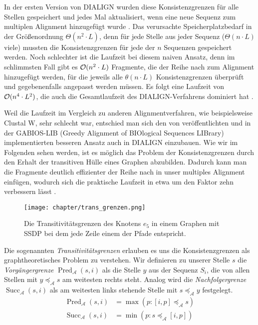 In der ersten Version von DIALIGN wurden diese Konsistenzgrenzen für alle Stellen gespeichert und jedes Mal aktualisiert, wenn eine neue Sequenz zum multiplen Alignment hinzugefügt wurde \cite{mdw96}. Das verursachte Speicherplatzbedarf in der Größenordnung $\Theta(n^2\cdot L)$, denn für jede Stelle aus jeder Sequenz ($\Theta(n\cdot L)$ viele) mussten die Konsistenzgrenzen für jede der $n$ Sequenzen gespeichert werden. Noch schlechter ist die Laufzeit bei diesem naiven Ansatz, denn im schlimmsten Fall gibt es $\mathcal{O}(n^2\cdot L)$ Fragmente, die der Reihe nach zum Alignment hinzugefügt werden, für die jeweils alle $\theta(n\cdot L)$ Konsistenzgrenzen überprüft und gegebenenfalls angepasst werden müssen. Es folgt eine Laufzeit von $\mathcal{O}(n^4\cdot L^2)$, die auch die Gesamtlaufzeit des DIALIGN-Verfahrens dominiert hat \cite{m99}. 

Weil die Laufzeit im Vergleich zu anderen Alignmentverfahren, wie beispielsweise Clustal W, sehr schlecht war, entschied man sich den von \cite{a97} veröffentlichten und in der GABIOS-LIB (Greedy Alignment of BIOlogical Sequences LIBrary) implementierten besseren Ansatz auch in DIALIGN	einzubauen. Wie wir im Folgenden sehen werden, ist es möglich das Problem der Konsistenzgrenzen durch den Erhalt der transitiven Hülle eines Graphen abzubilden. Dadurch kann man die Fragmente deutlich effizienter der Reihe nach in unser multiples Alignment einfügen, wodurch sich die praktische Laufzeit in etwa um den Faktor zehn verbessern lässt \cite{am00}. 

\begin{figure}[H]
	\centering
	\texttt{[image: chapter/trans\_grenzen.png]}
	\caption{Die Transitivitätsgrenzen des Knotens $e_5$ in einem Graphen mit SSDP bei dem jede Zeile einem der Pfade entspricht\cite{a97}.}\label{abb:trans_grenzen}
\end{figure}

\begin{definition}
	Die sogenannten \emph{Transitivitätsgrenzen} erlauben es uns die Konsistenzgrenzen als graphtheoretisches Problem zu verstehen. Wir definieren zu unserer Stelle $s$ die \emph{Vorgängergrenze} $\operatorname{Pred}_{\mathcal{A}}(s,i)$ als die Stelle $y$ aus der Sequenz $S_i$, die von allen Stellen mit $y \preceq_{\mathcal{A}} s$ am weitesten rechts steht. Analog wird die \emph{Nachfolgergrenze} $\operatorname{Succ}_{\mathcal{A}}(s,i)$ als am weitesten links stehende Stelle mit $s \preceq_{\mathcal{A}} y$ festgelegt.
	\begin{equation}
	\begin{split}
		\operatorname{\operatorname{Pred}}_{\mathcal{A}}(s,i) &= \max(p: [i,p] \preceq_{\mathcal{A}} s) \\
		\operatorname{\operatorname{Succ}}_{\mathcal{A}}(s,i) &= \min(p: s \preceq_{\mathcal{A}} [i,p])
	\end{split}
	\end{equation}
\end{definition}

